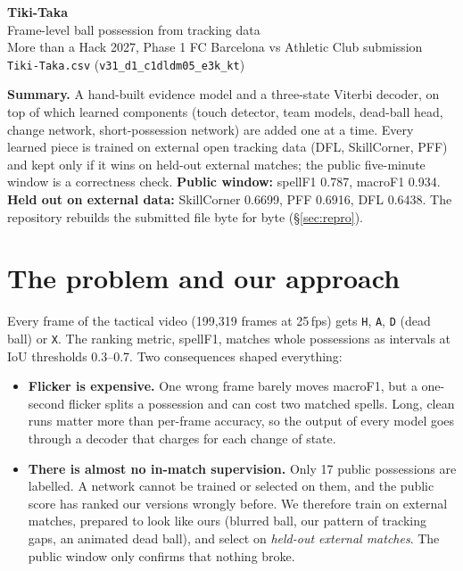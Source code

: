 \documentclass[10pt,a4paper]{article}
\newcommand{\code}[1]{\texttt{\small #1}}
\newcommand{\sF}{spellF1}
\newcommand{\mF}{macroF1}
\begin{document}
\begin{center}
  {\LARGE\bfseries\color{accent} Tiki-Taka}\\[3pt]
  {\large Frame-level ball possession from tracking data}\\[4pt]
  {\small\color{grey} More than a Hack 2027, Phase 1 \textperiodcentered{} FC Barcelona vs Athletic Club
  \textperiodcentered{} submission \code{Tiki-Taka.csv} (\code{v31\_d1\_c1dldm05\_e3k\_kt})}
\end{center}
\suppressfloats[t]   %

\vspace{2pt}
\noindent\colorbox{inbox}{\parbox{\dimexpr\linewidth-2\fboxsep}{\small
\textbf{Summary.} A hand-built evidence model and a three-state Viterbi decoder, on top of which
learned components (touch detector, team models, dead-ball head, change network, short-possession
network) are added one at a time. Every learned piece is trained on external open tracking data
(DFL, SkillCorner, PFF) and kept only if it wins on held-out external matches; the public
five-minute window is a correctness check. \textbf{Public window:} \sF{} 0.787, \mF{} 0.934.
\textbf{Held out on external data:} SkillCorner 0.6699, PFF 0.6916, DFL 0.6438. The repository
rebuilds the submitted file byte for byte (\S\ref{sec:repro}).}}

\section{The problem and our approach}

Every frame of the tactical video (199{,}319 frames at 25\,fps) gets \code{H}, \code{A}, \code{D}
(dead ball) or \code{X}. The ranking metric, \sF, matches whole possessions as intervals at IoU
thresholds 0.3--0.7. Two consequences shaped everything:

\begin{itemize}
  \item \textbf{Flicker is expensive.} One wrong frame barely moves \mF, but a one-second flicker
        splits a possession and can cost two matched spells. Long, clean runs matter more than
        per-frame accuracy, so the output of every model goes through a decoder that charges for
        each change of state.
  \item \textbf{There is almost no in-match supervision.} Only 17 public possessions are
        labelled. A network cannot be trained or selected on them, and the public score has
        ranked our versions wrongly before. We therefore train on external matches, prepared to
        look like ours (blurred ball, our pattern of tracking gaps, an animated dead ball), and
        select on \emph{held-out external matches}. The public window only confirms that nothing
        broke.
\end{itemize}
\end{document}
